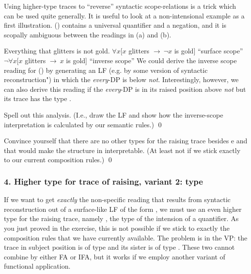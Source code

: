 \begin{exercise}
	
	Using higher-type traces to ``reverse'' syntactic scope-relations is a trick
  which can be used quite generally. It is useful to look at a non-intensional
  example as a first illustration. (\nextx) contains a universal quantifier and
  a negation, and it is scopally ambiguous between the readings in (a) and (b).
	
	\pex Everything that glitters is not gold.
  \a $\forall x[ x$ glitters $\rightarrow\ \ensuremath{\neg} x$ is gold]
  \hfill``surface scope''
  \a $\ensuremath{\neg}\forall x[ x$ glitters $\rightarrow\ x$ is gold]
  \hfill``inverse scope''
  \xe
%	
	We could derive the inverse scope reading for (\lastx) by generating an LF
  (e.g. by some version of syntactic reconstruction") in which the
  \emph{every}-DP is below \emph{not}. Interestingly, however, we can also
  derive this reading if the \emph{every}-DP is in its raised position above
  \emph{not} but its trace has the type .
	
	Spell out this analysis. (I.e., draw the LF and show how the inverse-scope
  interpretation is calculated by our semantic rules.) \qed
\end{exercise}
\begin{exercise}
	
	Convince yourself that there are no other types for the raising trace besides
  e and  that would make the structure in 
  interpretable. (At least not if we stick exactly to our current composition
  rules.) \qed
\end{exercise}

\subsubsection{4. Higher type for trace of raising, variant 2: type
  }

If we want to get \emph{exactly} the non-specific reading that results from
syntactic reconstruction out of a surface-like LF of the form , we
must use an even higher type for the raising trace, namely
, the type of the intension of a quantifier. As you
just proved in the exercise, this is not possible if we stick to exactly the
composition rules that we have currently available. The problem is in the VP:
the trace in subject position is of type  and its
sister is of type . These two cannot combine by either FA or IFA, but
it works if we employ another variant of functional application.%

